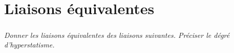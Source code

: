 \documentclass[10pt]{article}
\begin{document}






%
%

\section*{Liaisons équivalentes}
\subparagraph*{}\textit{Donner les liaisons équivalentes des liaisons suivantes. Préciser le dégré d'hyperstatisme.}
\end{document}
